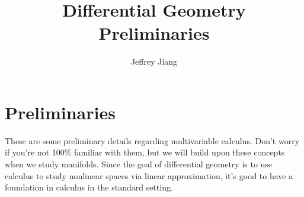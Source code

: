 \documentclass[psamsfonts]{amsart}
\theoremstyle{definition}
\theoremstyle{remark}
\begin{document}
%
\author{Jeffrey Jiang}
%
\title{Differential Geometry Preliminaries}
%
\setcounter{section}{-1}
%
\maketitle
%
\section{Preliminaries}
%
These are some preliminary details regarding multivariable calculus. Don't
worry if you're not 100\% familiar with them, but we will build upon these
concepts when we study manifolds. Since the goal of differential geometry
is to use calculus to study nonlinear spaces via linear approximation,
it's good to have a foundation in calculus in the standard setting.\\
\end{document}
